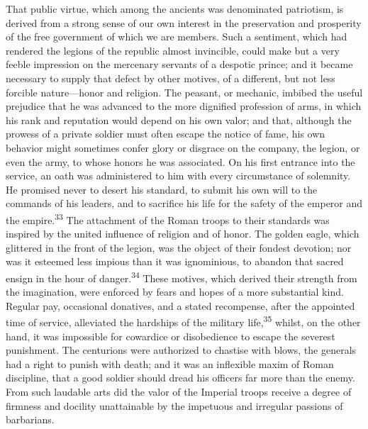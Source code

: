
That public virtue, which among the ancients was denominated
patriotism, is derived from a strong sense of our own interest in
the preservation and prosperity of the free government of which
we are members. Such a sentiment, which had rendered the legions
of the republic almost invincible, could make but a very feeble
impression on the mercenary servants of a despotic prince; and it
became necessary to supply that defect by other motives, of a
different, but not less forcible nature—honor and religion. The
peasant, or mechanic, imbibed the useful prejudice that he was
advanced to the more dignified profession of arms, in which his
rank and reputation would depend on his own valor; and that,
although the prowess of a private soldier must often escape the
notice of fame, his own behavior might sometimes confer glory or
disgrace on the company, the legion, or even the army, to whose
honors he was associated. On his first entrance into the service,
an oath was administered to him with every circumstance of
solemnity. He promised never to desert his standard, to submit
his own will to the commands of his leaders, and to sacrifice his
life for the safety of the emperor and the empire.\textsuperscript{33} The
attachment of the Roman troops to their standards was inspired by
the united influence of religion and of honor. The golden eagle,
which glittered in the front of the legion, was the object of
their fondest devotion; nor was it esteemed less impious than it
was ignominious, to abandon that sacred ensign in the hour of
danger.\textsuperscript{34} These motives, which derived their strength from the
imagination, were enforced by fears and hopes of a more
substantial kind. Regular pay, occasional donatives, and a stated
recompense, after the appointed time of service, alleviated the
hardships of the military life,\textsuperscript{35} whilst, on the other hand, it
was impossible for cowardice or disobedience to escape the
severest punishment. The centurions were authorized to chastise
with blows, the generals had a right to punish with death; and it
was an inflexible maxim of Roman discipline, that a good soldier
should dread his officers far more than the enemy. From such
laudable arts did the valor of the Imperial troops receive a
degree of firmness and docility unattainable by the impetuous and
irregular passions of barbarians.


